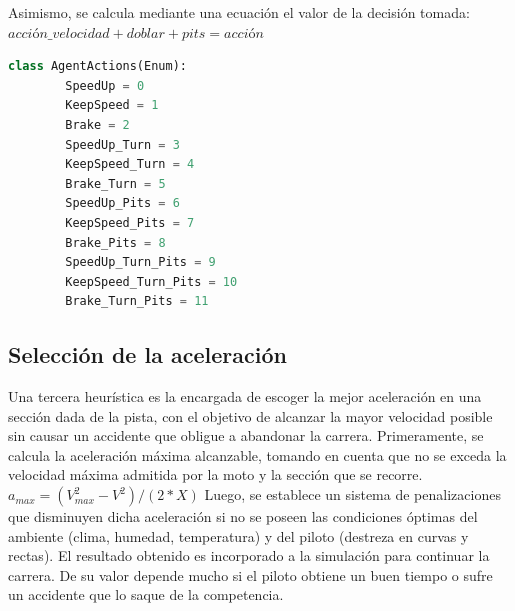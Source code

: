 \documentclass[12pt, letterpaper,spanish]{article}
\theoremstyle{definition}
\theoremstyle{remark}
\begin{document}
	Asimismo, se calcula mediante una ecuación el valor de la decisión tomada:
	$acción\_velocidad + doblar + pits = acción$
	
	\begin{lstlisting}[language={Python}, label={Script}]
		class AgentActions(Enum):
		SpeedUp = 0
		KeepSpeed = 1
		Brake = 2
		SpeedUp_Turn = 3
		KeepSpeed_Turn = 4
		Brake_Turn = 5
		SpeedUp_Pits = 6
		KeepSpeed_Pits = 7
		Brake_Pits = 8
		SpeedUp_Turn_Pits = 9
		KeepSpeed_Turn_Pits = 10
		Brake_Turn_Pits = 11
	\end{lstlisting}
	
	\subsection{Selección de la aceleración}
	Una tercera heurística es la encargada de escoger la mejor aceleración en una sección dada de la pista, con el objetivo de alcanzar la mayor velocidad posible sin causar un accidente que obligue a abandonar la carrera. 
	Primeramente, se calcula la aceleración máxima alcanzable, tomando en cuenta que no se exceda la velocidad máxima admitida por la moto y la sección que se recorre.
	$a_{max}=(V_{max}^{2}-V^{2})/(2*X)$
	Luego, se establece un sistema de penalizaciones que disminuyen dicha aceleración si no se poseen las condiciones óptimas del ambiente (clima, humedad, temperatura) y del piloto (destreza en curvas y rectas).
	El resultado obtenido es incorporado a la simulación para continuar la carrera. De su valor depende mucho si el piloto obtiene un buen tiempo o sufre un accidente que lo saque de la competencia.
	
\pagebreak


\end{document}
